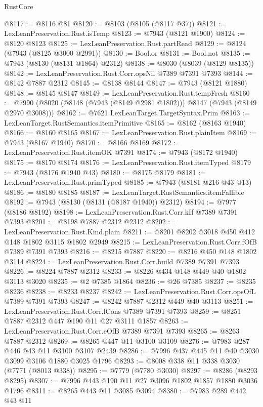 \begin{lexlean}{RustCore}
\begin{coremodule}
@8117 := @8116 @81
@8120 := @8103 (@8105 (@8117 @37))
@8121 := LexLeanPreservation.Rust.isTemp
@8123 := @7943 (@8121 @1900)
@8124 := @8120 @8123
@8125 := LexLeanPreservation.Rust.partRead
@8129 := @8124 (@7943 (@8125 @3000 @2991))
@8130 := Bool.or
@8131 := Bool.not
@8135 := @7943 (@8130 (@8131 @1864) @2312)
@8138 := @8030 (@8039 (@8129 @8135))
@8142 := LexLeanPreservation.Rust.Corr.opsNil @7389 @7391 @7393
@8144 := @8142 @7887 @2312
@8145 := @8138 @8144
@8147 := @7943 (@8121 @1880)
@8148 := @8145 @8147
@8149 := LexLeanPreservation.Rust.tempFresh
@8160 := @7990 (@8020 (@8148 (@7943 (@8149 @2981 @1802))) @8147 (@7943 (@8149 @2970 @3008)))
@8162 := @7621 LexLeanTarget.TargetSyntax.Prim
@8163 := LexLeanTarget.RustSemantics.itemPrimitive
@8165 := @8162 (@8163 @1940)
@8166 := @8160 @8165
@8167 := LexLeanPreservation.Rust.plainItem
@8169 := @7943 (@8167 @1940)
@8170 := @8166 @8169
@8172 := LexLeanPreservation.Rust.itemOK @7391
@8174 := @7943 (@8172 @1940)
@8175 := @8170 @8174
@8176 := LexLeanPreservation.Rust.itemTyped
@8179 := @7943 (@8176 @1940 @43)
@8180 := @8175 @8179
@8181 := LexLeanPreservation.Rust.primTyped
@8185 := @7943 (@8181 @216 @43 @13)
@8186 := @8180 @8185
@8187 := LexLeanTarget.RustSemantics.itemFallible
@8192 := @7943 (@8130 (@8131 (@8187 @1940)) @2312)
@8194 := @7977 (@8186 @8192)
@8198 := LexLeanPreservation.Rust.Corr.kIf @7389 @7391 @7393
@8201 := @8198 @7887 @2312 @2312
@8202 := LexLeanPreservation.Rust.Kind.plain
@8211 := @8201 @8202 @3018 @450 @412 @148 @1802 @3115 @1802 @2949
@8215 := LexLeanPreservation.Rust.Corr.fOfB @7389 @7391 @7393
@8216 := @8215 @7887
@8220 := @8216 @450 @148 @1802 @3114
@8224 := LexLeanPreservation.Rust.Corr.build @7389 @7391 @7393
@8226 := @8224 @7887 @2312
@8233 := @8226 @434 @148 @449 @40 @1802 @3113 @3020
@8235 := @2 @7385 @1864
@8236 := @26 @7385
@8237 := @8235 @8236
@8238 := @8233 @8237
@8242 := LexLeanPreservation.Rust.Corr.opsOfL @7389 @7391 @7393
@8247 := @8242 @7887 @2312 @449 @40 @3113
@8251 := LexLeanPreservation.Rust.Corr.lCons @7389 @7391 @7393
@8259 := @8251 @7887 @2312 @447 @190 @11 @27 @3111 @1857
@8263 := LexLeanPreservation.Rust.Corr.eOfB @7389 @7391 @7393
@8265 := @8263 @7887 @2312
@8269 := @8265 @447 @11 @3100 @3109
@8276 := @7983 @287 @446 @43 @11 @3100 @3107 @2439
@8286 := @7996 @437 @445 @11 @40 @3030 @3099 @3106 @1880 @3025 @1796
@8293 := @8008 @338 @11 @338 @3030 (@7771 (@8013 @338))
@8295 := @7779 (@7780 @3030)
@8297 := @8286 (@8293 @8295)
@8307 := @7996 @443 @190 @11 @27 @3096 @1802 @1857 @1880 @3036 @1796
@8311 := @8265 @443 @11 @3085 @3094
@8380 := @7983
    @289
    @442
    @43
    @11

\end{coremodule}
\end{lexlean}
